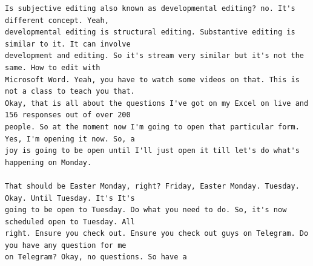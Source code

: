{\begin{Verbatim}
Is subjective editing also known as developmental editing? no. It's different concept. Yeah,
developmental editing is structural editing. Substantive editing is similar to it. It can involve
development and editing. So it's stream very similar but it's not the same. How to edit with
Microsoft Word. Yeah, you have to watch some videos on that. This is not a class to teach you that.
Okay, that is all about the questions I've got on my Excel on live and 156 responses out of over 200
people. So at the moment now I'm going to open that particular form. Yes, I'm opening it now. So, a
joy is going to be open until I'll just open it till let's do what's happening on Monday.

That should be Easter Monday, right? Friday, Easter Monday. Tuesday. Okay. Until Tuesday. It's It's
going to be open to Tuesday. Do what you need to do. So, it's now scheduled open to Tuesday. All
right. Ensure you check out. Ensure you check out guys on Telegram. Do you have any question for me
on Telegram? Okay, no questions. So have a
\end{Verbatim}
}
